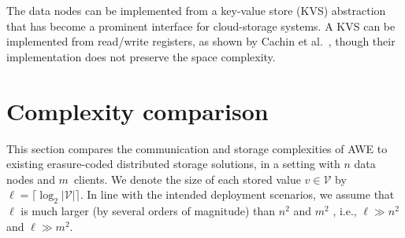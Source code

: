 \documentclass[oribibl]{llncs}
\theoremstyle{definition-boldhead}
\newcommand{\var}[1]{\textit{#1}}
\newcommand{\op}[1]{\textsl{#1}}
\newcommand{\values}{\ensuremath{\mathcal{V}}\xspace}
\newcommand{\dir}{\var{dir}\xspace}
\newcommand{\NAME}{AWE\xspace}
\newcommand{\node}{node\xspace}
\newcommand{\nodes}{nodes\xspace}
\providecommand{\note}[1]{}
\renewcommand{\note}[1]{[[\textsf{\bf #1}]]}
\begin{document}
The data \nodes can be implemented from a key-value store (KVS)
abstraction that has become a prominent interface for cloud-storage
systems.  A KVS can be implemented from read/write registers, as shown
by Cachin et al.~\cite{cajuso12}, though their implementation does
not preserve the space complexity.

\fi

\begin{comment}
\note{Readers may be Byzantine.}

In current formulation and the complexity analysis presented in
Section~\ref{} we implicitely assume that there are no Byzantine clients.
Clearly, given that a Byzantine writer could update \dir with timestamps that
do not correspond to values stored to data \nodes, readers could be
stalled from completing.
However, \NAME algorithms could resist such poisonous writer attacks with a
slight modification on the reader side. In particular, we could modify the
\var{highestread} operation such that it returns the highest $t+1$ timestamps
from the timestamps returned from the \var{readfrom} invocations within.
Then the reader could issue read requests for the data fragments stored
in each data \node for all $t+1$ values. Given that at most $t$ entries
are false, the reader is guaranteed to reconstruct at least one value.
Clearly, such an extension would increase the communication overhead of
\op{Read} into $(t+1)(t+k)\ell_v/k$ bits.

\note{The optimistic scheme of ORCAS~\cite{dugule08} can be an
  extension of this, if synchrony is assumed.  (ORCAS-A or -B??}

\note{In current formulation all data \nodes store the fragment, but
this is not needed; change d-WriteAck handler so that
additional parameter gcts denotes which data can be erased (all up
to and including gcts); for \nodes in wset, gcts=ts-1, for the
others gcts==ts, ie., they may erase the fragment again.}

\note{Address consistency amplification aspect.}
\note{Garbage collection could be disconnected from register-write operations.}

\end{comment}




\section{Complexity comparison}
\label{sec:complexity}

This section compares the communication and storage complexities of
\NAME to existing erasure-coded distributed storage solutions, in a
setting with $n$ data \nodes and $m$~clients.  We denote the size of
each stored value $v\in \values$ by $\ell = \lceil \log_2 |\values|
\rceil$.  In line with the intended deployment scenarios, we assume
that $\ell$ is much larger (by several orders of magnitude) than $n^2$
and $m^2$ , i.e., $\ell \gg n^2$ and $\ell \gg m^2$.
\end{document}
